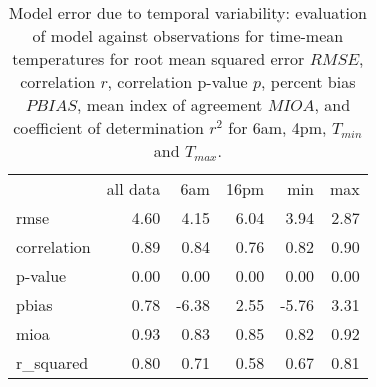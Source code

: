 \documentclass[draft,linenumbers]{agujournal}
\begin{document}
\begin{table}
\centering
\begin{tabular}{lrrrrr}
{} &  all data &     6am &   16pm &   min &  max \\
rmse        &      4.60 &  4.15 & 6.04 &  3.94 & 2.87 \\
correlation &      0.89 &  0.84 & 0.76 &  0.82 & 0.90 \\
p-value     &      0.00 &  0.00 & 0.00 &  0.00 & 0.00 \\
pbias       &      0.78 & -6.38 & 2.55 & -5.76 & 3.31 \\
mioa        &      0.93 &  0.83 & 0.85 &  0.82 & 0.92 \\
r\_squared   &      0.80 &  0.71 & 0.58 &  0.67 & 0.81 \\
\end{tabular}


\caption{Model error due to temporal variability: evaluation of model against observations for time-mean temperatures for root mean squared error $RMSE$, correlation  $r$, correlation p-value $p$, percent bias $PBIAS$, mean index of agreement $MIOA$, and coefficient of determination $r^2$ for 6am, 4pm, $T_{min}$ and $T_{max}$.  }
\label{tab:time_error}
\end{table}
\end{document}
